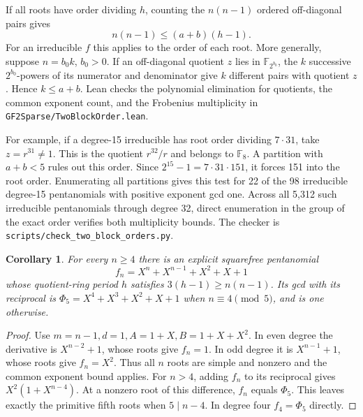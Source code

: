 \documentclass[11pt]{article}
\newtheorem{corollary}[theorem]{Corollary}
\begin{document}
If all roots have order dividing \(h\), counting the \(n(n-1)\)
ordered off-diagonal pairs gives
\[
             n(n-1)\le(a+b)(h-1).
\]
For an irreducible \(f\) this applies to the order of each root.
More generally, suppose \(n=b_0k\), \(b_0>0\). If an off-diagonal
quotient \(z\) lies in \(\mathbb F_{2^{b_0}}\), the \(k\) successive
\(2^{b_0}\)-powers of its numerator and denominator give \(k\)
different pairs with quotient \(z\). Hence \(k\le a+b\).
Lean checks the polynomial elimination for quotients, the common
exponent count, and the Frobenius multiplicity in
\nolinkurl{GF2Sparse/TwoBlockOrder.lean}.

For example, if a degree-15 irreducible has root order dividing
\(7\cdot31\), take \(z=r^{31}\ne1\). This is the quotient \(r^{32}/r\)
and belongs to \(\mathbb F_8\). A partition with \(a+b<5\) rules out
this order. Since \(2^{15}-1=7\cdot31\cdot151\), it forces 151 into
the root order. Enumerating all partitions gives this test for 22 of
the 98 irreducible degree-15 pentanomials with positive exponent gcd
one. Across all 5,312 such irreducible pentanomials through degree 32,
direct enumeration in the group of the exact order verifies both
multiplicity bounds. The checker is
\nolinkurl{scripts/check_two_block_orders.py}.

\begin{corollary}
For every \(n\ge4\) there is an explicit squarefree pentanomial
\[
       f_n=X^n+X^{n-1}+X^2+X+1
\]
whose quotient-ring period \(h\) satisfies \(3(h-1)\ge n(n-1)\).
Its gcd with its reciprocal is \(\Phi_5=X^4+X^3+X^2+X+1\)
when \(n\equiv4\pmod5\), and is one otherwise.
\end{corollary}
\begin{proof}
Use \(m=n-1,d=1,A=1+X,B=1+X+X^2\). In even degree the derivative
is \(X^{n-2}+1\), whose roots give \(f_n=1\). In odd degree it is
\(X^{n-1}+1\), whose roots give \(f_n=X^2\). Thus all \(n\) roots
are simple and nonzero and the common exponent bound applies.
For \(n>4\), adding \(f_n\) to its reciprocal gives
\(X^2(1+X^{n-4})\). At a nonzero root of this difference, \(f_n\)
equals \(\Phi_5\). This leaves exactly the primitive fifth roots
when \(5\mid n-4\). In degree four \(f_4=\Phi_5\) directly.
\end{proof}
\end{document}
